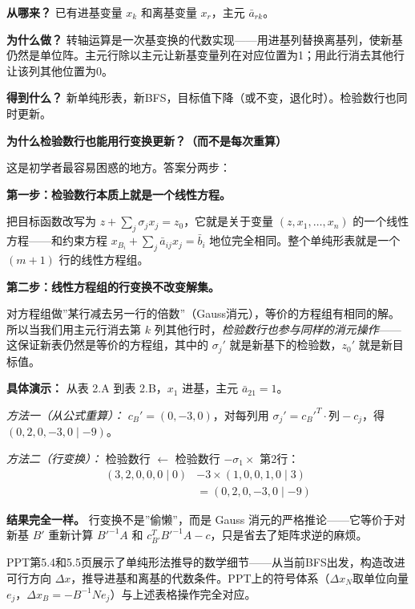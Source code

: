 {\textbf{从哪来？} 已有进基变量 $x_k$ 和离基变量 $x_r$，主元 $\bar{a}_{rk}$。

\textbf{为什么做？} 转轴运算是一次基变换的代数实现——用进基列替换离基列，使新基仍然是单位阵。主元行除以主元让新基变量列在对应位置为1；用此行消去其他行让该列其他位置为0。

\textbf{得到什么？} 新单纯形表，新BFS，目标值下降（或不变，退化时）。检验数行也同时更新。

\begin{notebox}
\textbf{为什么检验数行也能用行变换更新？（而不是每次重算）}

这是初学者最容易困惑的地方。答案分两步：

\textbf{第一步：检验数行本质上就是一个线性方程。}

把目标函数改写为 $z + \sum_{j}\sigma_j x_j = z_0$，它就是关于变量 $(z,x_1,\dots,x_n)$ 的一个线性方程——和约束方程 $x_{B_i} + \sum_j \bar{a}_{ij}x_j = \bar{b}_i$ 地位完全相同。整个单纯形表就是一个 $(m+1)$ 行的线性方程组。

\textbf{第二步：线性方程组的行变换不改变解集。}

对方程组做”某行减去另一行的倍数”（Gauss消元），等价的方程组有相同的解。所以当我们用主元行消去第 $k$ 列其他行时，\emph{检验数行也参与同样的消元操作}——这保证新表仍然是等价的方程组，其中的 $\sigma_j'$ 就是新基下的检验数，$z_0'$ 就是新目标值。

\textbf{具体演示：} 从表 2.A 到表 2.B，$x_1$ 进基，主元 $\bar{a}_{21}=1$。

\textit{方法一（从公式重算）：}
$c_B' = (0,-3,0)$，对每列用 $\sigma_j' = c_B'^T\!\cdot\!\text{列} - c_j$，得 $(0,2,0,-3,0\mid -9)$。

\textit{方法二（行变换）：}
检验数行 $\gets$ 检验数行 $- \sigma_1 \times$ 第2行：
\[
\begin{aligned}
(3,2,0,0,0\mid 0) &- 3\times(1,0,0,1,0\mid 3) \\
&= (0,2,0,-3,0\mid -9)
\end{aligned}
\]

\textbf{结果完全一样。} 行变换不是”偷懒”，而是 Gauss 消元的严格推论——它等价于对新基 $B'$ 重新计算 $B'^{-1}A$ 和 $c_{B'}^T B'^{-1}A - c$，只是省去了矩阵求逆的麻烦。
\end{notebox}}

PPT第5.4和5.5页展示了单纯形法推导的数学细节——从当前BFS出发，构造改进可行方向 $\Delta x$，推导进基和离基的代数条件。PPT上的符号体系（$\Delta x_N$取单位向量$e_j$，$\Delta x_B = -B^{-1}N e_j$）与上述表格操作完全对应。

\medskip
{}
\medskip
{}
\medskip

